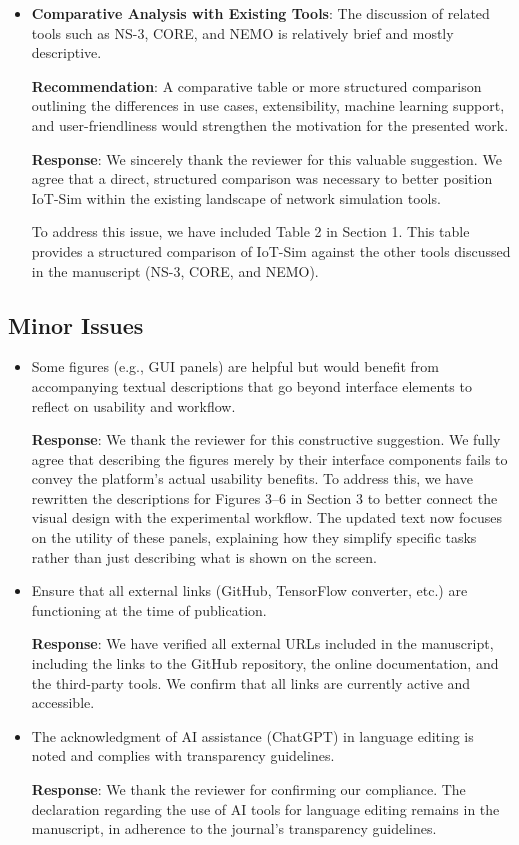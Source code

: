 \documentclass[12pt, a4paper]{article}
\begin{document}
\begin{itemize}
    \item \textbf{Comparative Analysis with Existing Tools}: The discussion of related tools such as NS-3, CORE, and NEMO is relatively brief and mostly descriptive.
    
    \textbf{Recommendation}: A comparative table or more structured comparison outlining the differences in use cases, extensibility, machine learning support, and user-friendliness would strengthen the motivation for the presented work.
    
    {\color{blue}
        \textbf{Response}: We sincerely thank the reviewer for this valuable suggestion. We agree that a direct, structured comparison was necessary to better position IoT-Sim within the existing landscape of network simulation tools.

        To address this issue, we have included Table 2 in Section 1. This table provides a structured comparison of IoT-Sim against the other tools discussed in the manuscript (NS-3, CORE, and NEMO).
    }
\end{itemize}

\subsection*{Minor Issues}
\begin{itemize}
    \item Some figures (e.g., GUI panels) are helpful but would benefit from accompanying textual descriptions that go beyond interface elements to reflect on usability and workflow.
    
    {\color{blue}
        \textbf{Response}: We thank the reviewer for this constructive suggestion. We fully agree that describing the figures merely by their interface components fails to convey the platform's actual usability benefits. To address this, we have rewritten the descriptions for Figures 3–6 in Section 3 to better connect the visual design with the experimental workflow. The updated text now focuses on the utility of these panels, explaining how they simplify specific tasks rather than just describing what is shown on the screen.
    }
    
    \item Ensure that all external links (GitHub, TensorFlow converter, etc.) are functioning at the time of publication.
    
    {\color{blue}
        \textbf{Response}: We have verified all external URLs included in the manuscript, including the links to the GitHub repository, the online documentation, and the third-party tools. We confirm that all links are currently active and accessible.
    }
    
    \item The acknowledgment of AI assistance (ChatGPT) in language editing is noted and complies with transparency guidelines.
    
    {\color{blue}
        \textbf{Response}: We thank the reviewer for confirming our compliance. The declaration regarding the use of AI tools for language editing remains in the manuscript, in adherence to the journal’s transparency guidelines.
    }
\end{itemize}
\end{document}
